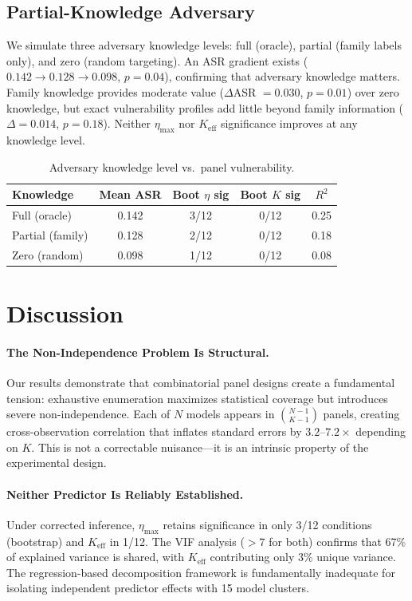 \documentclass[11pt]{article}
\begin{document}
\subsection{Partial-Knowledge Adversary}
\label{sec:partial_knowledge}

We simulate three adversary knowledge levels: full (oracle), partial (family labels only), and zero (random targeting). An ASR gradient exists ($0.142 \to 0.128 \to 0.098$, $p = 0.04$), confirming that adversary knowledge matters. Family knowledge provides moderate value ($\Delta$ASR $= 0.030$, $p = 0.01$) over zero knowledge, but exact vulnerability profiles add little beyond family information ($\Delta = 0.014$, $p = 0.18$). Neither $\eta_{\max}$ nor $K_{\text{eff}}$ significance improves at any knowledge level.

\begin{table}[h]
\centering
\caption{Adversary knowledge level vs.\ panel vulnerability.}
\label{tab:partial_knowledge}
\small
\begin{tabular}{lcccc}
\toprule
Knowledge & Mean ASR & Boot $\eta$ sig & Boot $K$ sig & $R^2$ \\
\midrule
Full (oracle) & 0.142 & 3/12 & 0/12 & 0.25 \\
Partial (family) & 0.128 & 2/12 & 0/12 & 0.18 \\
Zero (random) & 0.098 & 1/12 & 0/12 & 0.08 \\
\bottomrule
\end{tabular}
\end{table}


\section{Discussion}

\paragraph{The Non-Independence Problem Is Structural.} Our results demonstrate that combinatorial panel designs create a fundamental tension: exhaustive enumeration maximizes statistical coverage but introduces severe non-independence. Each of $N$ models appears in $\binom{N-1}{K-1}$ panels, creating cross-observation correlation that inflates standard errors by $3.2$--$7.2\times$ depending on $K$. This is not a correctable nuisance---it is an intrinsic property of the experimental design.

\paragraph{Neither Predictor Is Reliably Established.} Under corrected inference, $\eta_{\max}$ retains significance in only 3/12 conditions (bootstrap) and $K_{\text{eff}}$ in 1/12. The VIF analysis ($>7$ for both) confirms that 67\% of explained variance is shared, with $K_{\text{eff}}$ contributing only 3\% unique variance. The regression-based decomposition framework is fundamentally inadequate for isolating independent predictor effects with 15 model clusters.
\end{document}
